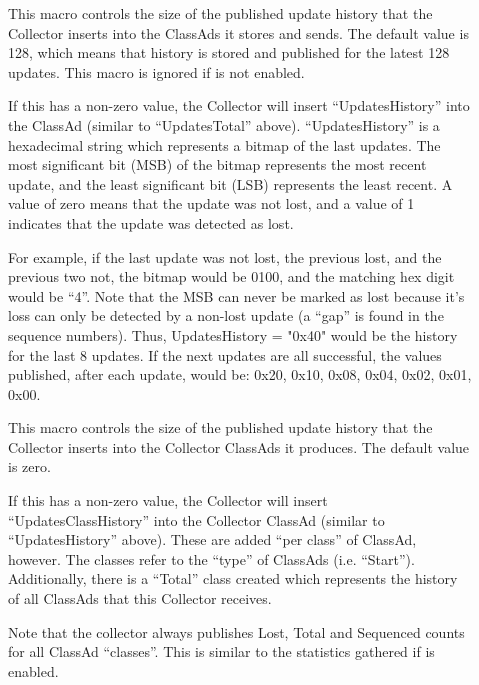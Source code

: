 \begin{description}
\item[]
  \label{param:CollectorDaemonHistorySize} This macro controls the
  size of the published update history that the Collector inserts into
  the ClassAds it stores and sends.  The default value is 128, which
  means that history is stored and published for the latest 128
  updates.  This macro is ignored if 
  is not enabled.

  If this has a non-zero value, the Collector will insert
  ``UpdatesHistory'' into the ClassAd (similar to ``UpdatesTotal''
  above).  ``UpdatesHistory'' is a hexadecimal string which represents
  a bitmap of the last 
  updates.  The most significant bit (MSB) of the bitmap represents the
  most recent update, and the least significant bit (LSB) represents
  the least recent.  A value of zero means that the update was not
  lost, and a value of 1 indicates that the update was detected as
  lost.

  For example, if the last update was not lost, the previous lost, and
  the previous two not, the bitmap would be 0100, and the matching hex
  digit would be ``4''.  Note that the MSB can never be marked as lost
  because it's loss can only be detected by a non-lost update (a
  ``gap'' is found in the sequence numbers).  Thus, UpdatesHistory =
  "0x40" would be the history for the last 8 updates.  If the next
  updates are all successful, the values published, after each update,
  would be: 0x20, 0x10, 0x08, 0x04, 0x02, 0x01, 0x00.

\item[]
  \label{param:CollectorClassHistorySize} This macro controls the
  size of the published update history that the Collector inserts into
  the Collector ClassAds it produces.  The default value is zero.

  If this has a non-zero value, the Collector will insert
  ``UpdatesClassHistory'' into the Collector ClassAd (similar to
  ``UpdatesHistory'' above).  These are added ``per class'' of
  ClassAd, however.  The classes refer to the ``type'' of ClassAds
  (i.e. ``Start'').  Additionally, there is a ``Total'' class created
  which represents the history of all ClassAds that this Collector
  receives.

  Note that the collector always publishes Lost, Total and Sequenced
  counts for all ClassAd ``classes''.  This is similar to the
  statistics gathered if  is enabled.


\end{description}
